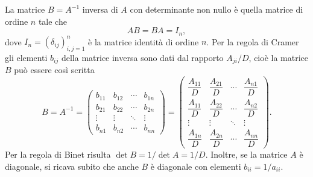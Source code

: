 La matrice $B = A^{-1}$ inversa di $A$ con determinante non nullo è quella
matrice di ordine $n$ tale che
\begin{equation}
  A B = B A = I_{n},
\end{equation}
dove $I_{n} = (\delta_{ij})_{i,j=1}^{n}$ è la matrice identità di ordine
$n$. Per la regola di Cramer gli elementi $b_{ij}$ della matrice inversa sono
dati dal rapporto $A_{ji}/D$, cioè la matrice $B$ può essere così scritta
\begin{equation}
  B = A^{-1} =
  \begin{pmatrix}
    b_{11} & b_{12} & \cdots & b_{1n} \\
    b_{21} & b_{22} & \cdots & b_{2n} \\
    \vdots & \vdots & \ddots & \vdots \\
    b_{n1} & b_{n2} & \cdots & b_{nn}
  \end{pmatrix} =
  \begin{pmatrix}
    \dfrac{A_{11}}{D} & \dfrac{A_{21}}{D} & \cdots & \dfrac{A_{n1}}{D} \\[2.0ex]
    \dfrac{A_{11}}{D} & \dfrac{A_{22}}{D} & \cdots & \dfrac{A_{n2}}{D} \\[2.0ex]
    \vdots            & \vdots            & \ddots & \vdots            \\[2.0ex]
    \dfrac{A_{1n}}{D} & \dfrac{A_{2n}}{D} & \cdots & \dfrac{A_{nn}}{D}
  \end{pmatrix}.
\end{equation}
Per la regola di Binet risulta $\det B = 1/\det A = 1/D$.  Inoltre, se la
matrice $A$ è diagonale, si ricava subito che anche $B$ è diagonale con elementi
$b_{ii}=1/a_{ii}$.

